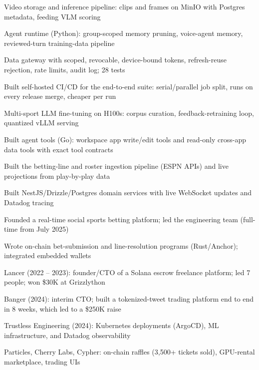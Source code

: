 \documentclass[print]{jack-resume}
\begin{document}
\begin{tightemize}
    \item Video storage and inference pipeline: clips and frames on MinIO with Postgres metadata, feeding VLM scoring
    \item Agent runtime (Python): group-scoped memory pruning, voice-agent memory, reviewed-turn training-data pipeline
    \item Data gateway with scoped, revocable, device-bound tokens, refresh-reuse rejection, rate limits, audit log; 28 tests
    \item Built self-hosted CI/CD for the end-to-end suite: serial/parallel job split, runs on every release merge, cheaper per run
    \item Multi-sport LLM fine-tuning on H100s: corpus curation, feedback-retraining loop, quantized vLLM serving
    \item Built agent tools (Go): workspace app write/edit tools and read-only cross-app data tools with exact tool contracts
\end{tightemize}
\sectionsep

\begin{tightemize}
    \item Built the betting-line and roster ingestion pipeline (ESPN APIs) and live projections from play-by-play data
    \item Built NestJS/Drizzle/Postgres domain services with live WebSocket updates and Datadog tracing
    \item Founded a real-time social sports betting platform; led the engineering team (full-time from July 2025)
    \item Wrote on-chain bet-submission and line-resolution programs (Rust/Anchor); integrated embedded wallets
\end{tightemize}
\sectionsep

\begin{tightemize}
    \item Lancer (2022 – 2023): founder/CTO of a Solana escrow freelance platform; led 7 people; won \$30K at Grizzlython
    \item Banger (2024): interim CTO; built a tokenized-tweet trading platform end to end in 8 weeks, which led to a \$250K raise
    \item Trustless Engineering (2024): Kubernetes deployments (ArgoCD), ML infrastructure, and Datadog observability
    \item Particles, Cherry Labs, Cypher: on-chain raffles (3,500+ tickets sold), GPU-rental marketplace, trading UIs
\end{tightemize}
\sectionsep
\end{document}
